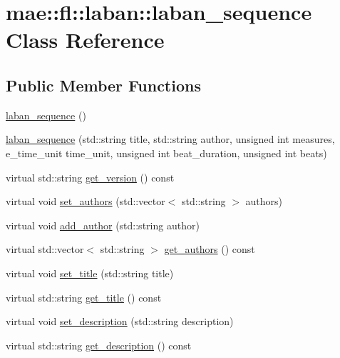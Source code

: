 \hypertarget{classmae_1_1fl_1_1laban_1_1laban__sequence}{\section{mae\-:\-:fl\-:\-:laban\-:\-:laban\-\_\-sequence Class Reference}
\label{classmae_1_1fl_1_1laban_1_1laban__sequence}
}
\subsection*{Public Member Functions}
\begin{DoxyCompactItemize}
\item 
\hyperlink{classmae_1_1fl_1_1laban_1_1laban__sequence_aea8ae4b1e4d3feb0ee0543cbbb2832e0}{laban\-\_\-sequence} ()
\item 
\hyperlink{classmae_1_1fl_1_1laban_1_1laban__sequence_a6c38a4f129eb701a5ba6e9c7b733ca22}{laban\-\_\-sequence} (std\-::string title, std\-::string author, unsigned int measures, e\-\_\-time\-\_\-unit time\-\_\-unit, unsigned int beat\-\_\-duration, unsigned int beats)
\item 
virtual std\-::string \hyperlink{classmae_1_1fl_1_1laban_1_1laban__sequence_a43232b628e0e8357117b8a16cb7ad98a}{get\-\_\-version} () const 
\item 
virtual void \hyperlink{classmae_1_1fl_1_1laban_1_1laban__sequence_ab19b3382f85f55843423b0424c21258e}{set\-\_\-authors} (std\-::vector$<$ std\-::string $>$ authors)
\item 
virtual void \hyperlink{classmae_1_1fl_1_1laban_1_1laban__sequence_a983fa45878b40ab6ed29d5651f46cc62}{add\-\_\-author} (std\-::string author)
\item 
virtual std\-::vector$<$ std\-::string $>$ \hyperlink{classmae_1_1fl_1_1laban_1_1laban__sequence_a7a928c3b3685f30b7f3378cbaf30921c}{get\-\_\-authors} () const 
\item 
virtual void \hyperlink{classmae_1_1fl_1_1laban_1_1laban__sequence_acf3dac3aff6a0702a9a0554cf58eb1df}{set\-\_\-title} (std\-::string title)
\item 
virtual std\-::string \hyperlink{classmae_1_1fl_1_1laban_1_1laban__sequence_a1b46ea6aafa9525c62124eb3694cac53}{get\-\_\-title} () const 
\item 
virtual void \hyperlink{classmae_1_1fl_1_1laban_1_1laban__sequence_a919294027f8e901bab357a62c3f52ff3}{set\-\_\-description} (std\-::string description)
\item 
virtual std\-::string \hyperlink{classmae_1_1fl_1_1laban_1_1laban__sequence_ac33435fc797bae0d3898c55d5a22aab7}{get\-\_\-description} () const 

\end{DoxyCompactItemize}
